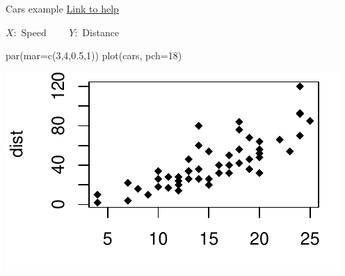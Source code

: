 \documentclass[
  ignorenonframetext,
]{beamer}
\newenvironment{Shaded}{\begin{snugshade}}{\end{snugshade}}
\newcommand{\AttributeTok}[1]{\textcolor[rgb]{0.77,0.63,0.00}{#1}}
\newcommand{\DecValTok}[1]{\textcolor[rgb]{0.00,0.00,0.81}{#1}}
\newcommand{\FloatTok}[1]{\textcolor[rgb]{0.00,0.00,0.81}{#1}}
\newcommand{\FunctionTok}[1]{\textcolor[rgb]{0.00,0.00,0.00}{#1}}
\newcommand{\NormalTok}[1]{#1}
\begin{document}
\begin{frame}[fragile]{Cars example}
\protect\hypertarget{cars-example}{}
\href{./cars.html}{Link to help}

\(X:\) Speed \(\qquad Y:\) Distance

\begin{Shaded}
\begin{Highlighting}[]
\FunctionTok{par}\NormalTok{(}\AttributeTok{mar=}\FunctionTok{c}\NormalTok{(}\DecValTok{3}\NormalTok{,}\DecValTok{4}\NormalTok{,}\FloatTok{0.5}\NormalTok{,}\DecValTok{1}\NormalTok{))}
\FunctionTok{plot}\NormalTok{(cars, }\AttributeTok{pch=}\DecValTok{18}\NormalTok{)}
\end{Highlighting}
\end{Shaded}

\includegraphics{Lec1_files/figure-beamer/cars1-1.pdf}
\end{frame}
\end{document}
